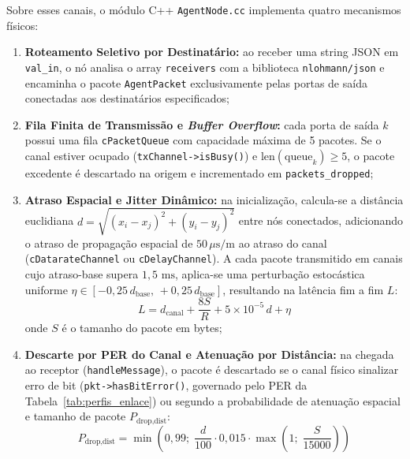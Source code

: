 \documentclass[10pt,twocolumn,a4paper]{article}
\begin{document}
Sobre esses canais, o módulo C++ \texttt{AgentNode.cc} implementa quatro mecanismos físicos:
\begin{enumerate}
    \item \textbf{Roteamento Seletivo por Destinatário:} ao receber uma string JSON em \texttt{val\_in}, o nó analisa o array \texttt{receivers} com a biblioteca \texttt{nlohmann/json} e encaminha o pacote \texttt{AgentPacket} exclusivamente pelas portas de saída conectadas aos destinatários especificados;
    \item \textbf{Fila Finita de Transmissão e \textit{Buffer Overflow}:} cada porta de saída $k$ possui uma fila \texttt{cPacketQueue} com capacidade máxima de 5 pacotes. Se o canal estiver ocupado (\texttt{txChannel->isBusy()}) e $\text{len}(\text{queue}_k) \ge 5$, o pacote excedente é descartado na origem e incrementado em \texttt{packets\_dropped};
    \item \textbf{Atraso Espacial e Jitter Dinâmico:} na inicialização, calcula-se a distância euclidiana $d = \sqrt{(x_i - x_j)^2 + (y_i - y_j)^2}$ entre nós conectados, adicionando o atraso de propagação espacial de $50\,\mu\text{s/m}$ ao atraso do canal (\texttt{cDatarateChannel} ou \texttt{cDelayChannel}). A cada pacote transmitido em canais cujo atraso-base supera $1{,}5\text{ ms}$, aplica-se uma perturbação estocástica uniforme $\eta \in [-0{,}25\,d_{\text{base}},\, +0{,}25\,d_{\text{base}}]$, resultando na latência fim a fim $L$:
    \begin{equation}
        L = d_{\text{canal}} + \frac{8S}{R} + 5\times 10^{-5}\,d + \eta
        \label{eq:latencia}
    \end{equation}
    onde $S$ é o tamanho do pacote em bytes;
    \item \textbf{Descarte por PER do Canal e Atenuação por Distância:} na chegada ao receptor (\texttt{handleMessage}), o pacote é descartado se o canal físico sinalizar erro de bit (\texttt{pkt->hasBitError()}, governado pelo PER da Tabela~\ref{tab:perfis_enlace}) ou segundo a probabilidade de atenuação espacial e tamanho de pacote $P_{\text{drop,dist}}$:
    \begin{equation}
        P_{\text{drop,dist}} = \min\!\left(0{,}99;\; \frac{d}{100}\cdot 0{,}015\cdot \max\!\left(1;\; \frac{S}{15000}\right)\right)
        \label{eq:drop}
    \end{equation}
\end{enumerate}

\end{document}
